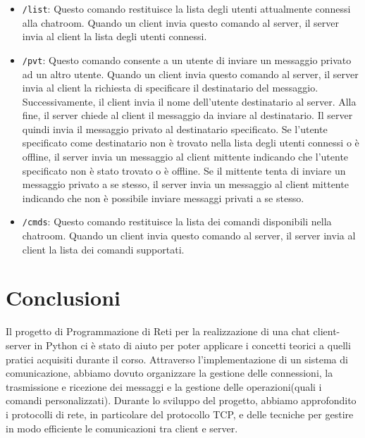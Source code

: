 \documentclass[a4paper,12pt]{report}
\begin{document}
\begin{itemize}
	\item \texttt{/list}: Questo comando restituisce la lista degli utenti attualmente connessi alla chatroom. Quando un client invia questo comando al server, il server invia al client la lista degli utenti connessi.
	\item \texttt{/pvt}: Questo comando consente a un utente di inviare un messaggio privato ad un altro utente. Quando un client invia questo comando al server, il server invia al client la richiesta di specificare il destinatario del messaggio. Successivamente, il client invia il nome dell'utente destinatario al server. Alla fine, il server chiede al client il messaggio da inviare al destinatario. Il server quindi invia il messaggio privato al destinatario specificato. Se l'utente specificato come destinatario non è trovato nella lista degli utenti connessi o è offline, il server invia un messaggio al client mittente indicando che l'utente specificato non è stato trovato o è offline.
	Se il mittente tenta di inviare un messaggio privato a se stesso, il server invia un messaggio al client mittente indicando che non è possibile inviare messaggi privati a se stesso.
	\item \texttt{/cmds}: Questo comando restituisce la lista dei comandi disponibili nella chatroom. Quando un client invia questo comando al server, il server invia al client la lista dei comandi supportati.
\end{itemize}

\chapter{Conclusioni}
Il progetto di Programmazione di Reti per la realizzazione di una chat client-server in Python ci è stato di aiuto per poter applicare i concetti teorici a quelli pratici acquisiti durante il corso. Attraverso l'implementazione di un sistema di comunicazione, abbiamo dovuto organizzare la gestione delle connessioni, la trasmissione e ricezione dei messaggi e la gestione delle operazioni(quali i comandi personalizzati).
Durante lo sviluppo del progetto, abbiamo approfondito i protocolli di rete, in particolare del protocollo TCP, e delle tecniche per gestire in modo efficiente le comunicazioni tra client e server. 
\end{document}
